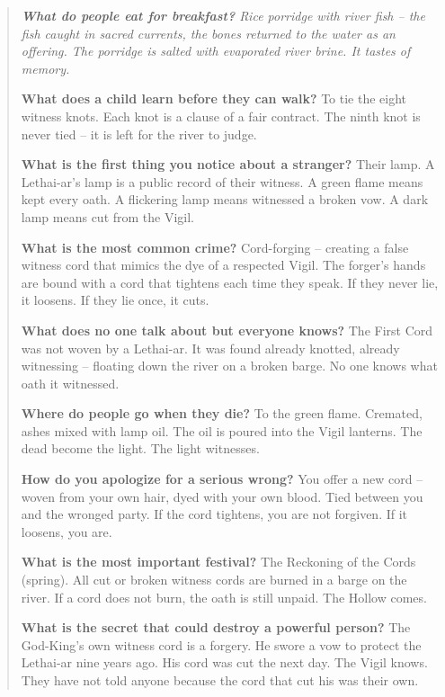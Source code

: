 \documentclass[12pt,oneside]{book}
\newenvironment{almanac}
  {\begin{quote}\small\itshape}
  {\end{quote}}
\begin{document}
\vspace{1em}
\begin{almanac}
\textbf{What do people eat for breakfast?} Rice porridge with river fish -- the fish caught in sacred currents, the bones returned to the water as an offering. The porridge is salted with evaporated river brine. It tastes of memory.

\textbf{What does a child learn before they can walk?} To tie the eight witness knots. Each knot is a clause of a fair contract. The ninth knot is never tied -- it is left for the river to judge.

\textbf{What is the first thing you notice about a stranger?} Their lamp. A Lethai-ar's lamp is a public record of their witness. A green flame means kept every oath. A flickering lamp means witnessed a broken vow. A dark lamp means cut from the Vigil.

\textbf{What is the most common crime?} Cord-forging -- creating a false witness cord that mimics the dye of a respected Vigil. The forger's hands are bound with a cord that tightens each time they speak. If they never lie, it loosens. If they lie once, it cuts.

\textbf{What does no one talk about but everyone knows?} The First Cord was not woven by a Lethai-ar. It was found already knotted, already witnessing -- floating down the river on a broken barge. No one knows what oath it witnessed.

\textbf{Where do people go when they die?} To the green flame. Cremated, ashes mixed with lamp oil. The oil is poured into the Vigil lanterns. The dead become the light. The light witnesses.

\textbf{How do you apologize for a serious wrong?} You offer a new cord -- woven from your own hair, dyed with your own blood. Tied between you and the wronged party. If the cord tightens, you are not forgiven. If it loosens, you are.

\textbf{What is the most important festival?} The Reckoning of the Cords (spring). All cut or broken witness cords are burned in a barge on the river. If a cord does not burn, the oath is still unpaid. The Hollow comes.

\textbf{What is the secret that could destroy a powerful person?} The God-King's own witness cord is a forgery. He swore a vow to protect the Lethai-ar nine years ago. His cord was cut the next day. The Vigil knows. They have not told anyone because the cord that cut his was their own.
\end{almanac}
\end{document}
